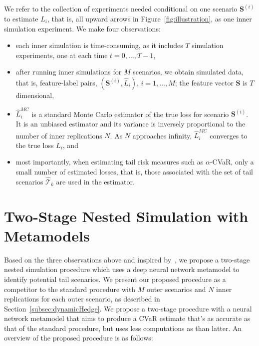 \documentclass[]{article}
\newcommand{\tail}{\mathcal{T}}
\newcommand{\bS}{\bm{S}}
\newcommand{\Lhat}{\widehat{L}}
\begin{document}
We refer to the collection of experiments needed conditional on one scenario $\bS^{(i)}$ to estimate $L_i$, that is, all upward arrows in Figure~\ref{fig:illustration}, as one inner simulation experiment.
We make four observations:
\begin{itemize}
    \item   each inner simulation is time-consuming, as it includes $T$ simulation experiments, one at each time $t=0,\ldots,T-1$,
    \item   after running inner simulations for $M$ scenarios, we obtain simulated data, that is, feature-label pairs, $(\bS^{(i)}, \Lhat_i)$, $i=1,\ldots,M$; the feature vector $\bS$ is $T$ dimensional,
    \item   $\Lhat_i^{MC}$ is a standard Monte Carlo estimator of the true loss for scenario $\bS^{(i)}$. It is an unbiased estimator and its variance is inversely proportional to the number of inner replications $N$. 
    As $N$ approaches infinity, $\Lhat_i^{MC}$ converges to the true loss $L_i$, and
    \item   most importantly, when estimating tail risk measures such as $\alpha$-CVaR, only a small number of estimated losses, that is, those associated with the set of tail scenarios $\widehat{\tail}_{k}$ are used in the estimator.
\end{itemize}

\section{Two-Stage Nested Simulation with Metamodels} \label{sec:metamodel2Stage}

Based on the three observations above and inspired by~\cite{dang2020efficient}, we propose a two-stage nested simulation procedure which uses a deep neural network metamodel to identify potential tail scenarios.
We present our proposed procedure as a competitor to the standard procedure with $M$ outer scenarios and $N$ inner replications for each outer scenario, as described in Section~\ref{subsec:dynamicHedge}.
We propose a two-stage procedure with a neural network metamodel that aims to produce a CVaR estimate that's as accurate as that of the standard procedure, but uses less computations as than latter.
An overview of the proposed procedure is as follows:
\end{document}
